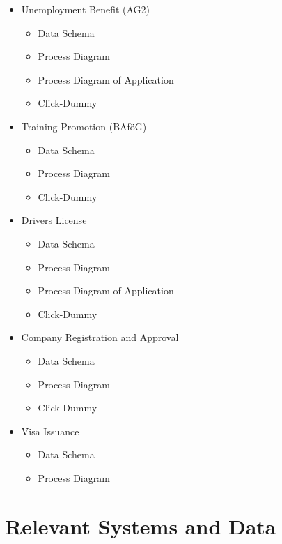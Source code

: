 \documentclass[
     12pt,         %
     a4paper,      %
     BCOR10mm,     %
     DIV14,        %
aragraph skip instad of paragraph indent
     ]{scrreprt}
\begin{document}
\begin{itemize}
     \item Unemployment Benefit (AG2)
\begin{itemize}
     \item Data Schema
     \item Process Diagram
     \item Process Diagram of Application
     \item Click-Dummy
\end{itemize}

\item Training Promotion (BAföG)
\begin{itemize}
     \item Data Schema
     \item Process Diagram
     \item Click-Dummy
\end{itemize}

\item Drivers License
\begin{itemize}
     \item Data Schema
     \item Process Diagram
     \item Process Diagram of Application
     \item Click-Dummy
\end{itemize}

\item Company Registration and Approval
\begin{itemize}
     \item Data Schema
     \item Process Diagram
     \item Click-Dummy
\end{itemize}

\item Visa Issuance
\begin{itemize}
     \item Data Schema
     \item Process Diagram
\end{itemize}


\end{itemize}


\section{Relevant Systems and Data}

\end{document}
